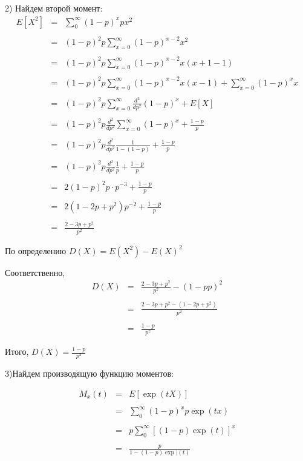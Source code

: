 \documentclass[a4paper,12pt, oneside]{article}
\begin{document}
2) Найдем второй момент:
$$
\begin{array}{rcl}
E[X^2] &=& \sum\limits_{0}^{\infty} (1 - p)^x px^2\\
\\
&=&(1-p)^2 p \sum\limits_{x=0}^{\infty} (1-p)^{x-2}x^2\\
\\
&=&(1-p)^2 p \sum\limits_{x=0}^{\infty} (1-p)^{x-2}x (x + 1 -1)\\
\\
&=&(1-p)^2 p \sum\limits_{x=0}^{\infty} (1-p)^{x-2}x (x -1) + \sum\limits_{x=0}^{\infty} (1-p)^{x}x \\
\\
&=&(1-p)^2 p  \sum\limits_{x=0}^{\infty} \frac{d^2}{dp^2}(1-p)^x + E[X]\\
\\
&=& (1-p)^2 p \frac{d^2}{dp^2} \sum\limits_{x=0}^{\infty} (1-p)^x + \frac{1-p}{p}\\
\\
&=&(1-p)^2 p \frac{d^2}{dp^2} \frac{1}{1-(1-p)} + \frac{1-p}{p}\\
\\
&=& (1-p)^2 p \frac{d^2}{dp^2} \frac{1}{p} + \frac{1-p}{p}\\
\\
&=& 2(1-p)^2 p\cdot p^{-3} + \frac{1-p}{p}\\
\\
&=&2(1-2p+p^2)p^{-2} + \frac{1-p}{p}\\
\\
&=&\frac{2 - 3p + p^2}{p^2}
\end{array}
$$

По определению $D(X) = E(X^2) - E(X)^2$

Соответственно,
$$
\begin{array}{rcl}
D(X) &=&\frac{2 - 3p+p^2}{p^2} - ({1-p}{p})^2\\
\\
&=&\frac{2-3p+p^2 -(1-2p + p^2)}{p^2}\\
\\
&=&\frac{1-p}{p^2}
\end{array}
$$

Итого, $D(X) = \frac{1-p}{p^2} $



3)Найдем производящую функцию моментов:

$$
\begin{array}{rcl}
M_x(t) &=& E[\exp(tX)] \\
\\
&=&\sum\limits_{0}^{\infty} (1 - p)^x p \exp(tx)\\
\\
&=& p \sum\limits_{0}^{\infty} [(1 - p)  \exp(t)]^x\\
\\
&=& \frac{p}{1-(1-p)\exp|(t)}
\end{array}
$$
\end{document}
